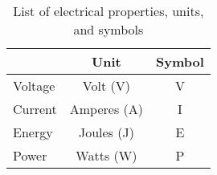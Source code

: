 \begin{table}[H]
\centering
\caption{List of electrical properties, units, and symbols}
\begin{tabular}{l|c|c|}
\cline{2-3}
                              & Unit        & Symbol \\ \hline
\multicolumn{1}{|l|}{Voltage} & Volt (V)    & V      \\
\multicolumn{1}{|l|}{Current} & Amperes (A) & I      \\
\multicolumn{1}{|l|}{Energy}  & Joules (J)  & E      \\
\multicolumn{1}{|l|}{Power}   & Watts (W)   & P      \\ \hline
\end{tabular}
\end{table}